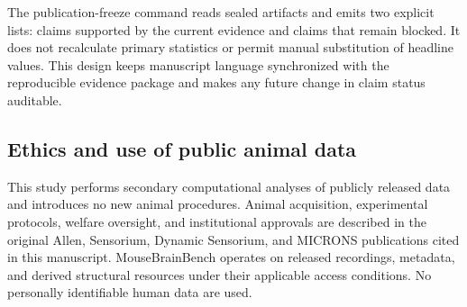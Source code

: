 The publication-freeze command reads sealed artifacts and emits two explicit
lists: claims supported by the current evidence and claims that remain blocked.
It does not recalculate primary statistics or permit manual substitution of
headline values. This design keeps manuscript language synchronized with the
reproducible evidence package and makes any future change in claim status
auditable.

\subsection{Ethics and use of public animal data}

This study performs secondary computational analyses of publicly released data
and introduces no new animal procedures. Animal acquisition, experimental
protocols, welfare oversight, and institutional approvals are described in the
original Allen, Sensorium, Dynamic Sensorium, and MICRONS publications cited in
this manuscript. MouseBrainBench operates on released recordings, metadata, and
derived structural resources under their applicable access conditions. No
personally identifiable human data are used.
